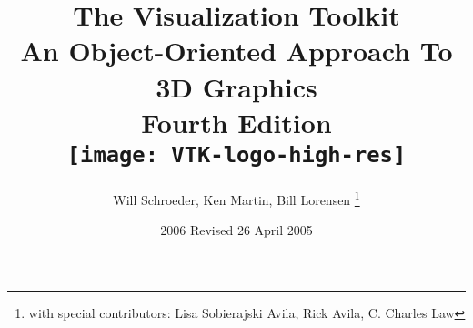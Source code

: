 \title{The Visualization Toolkit \\ An Object-Oriented Approach To 3D Graphics \\ Fourth Edition\\  \texttt{[image: VTK-logo-high-res]}\\}
\author{Will Schroeder, Ken Martin, Bill Lorensen
\thanks{with special contributors: Lisa Sobierajski Avila, Rick Avila, C. Charles Law}
\date { 2006 Revised 26 April 2005}}

\clearpage\maketitle
\thispagestyle{empty}



